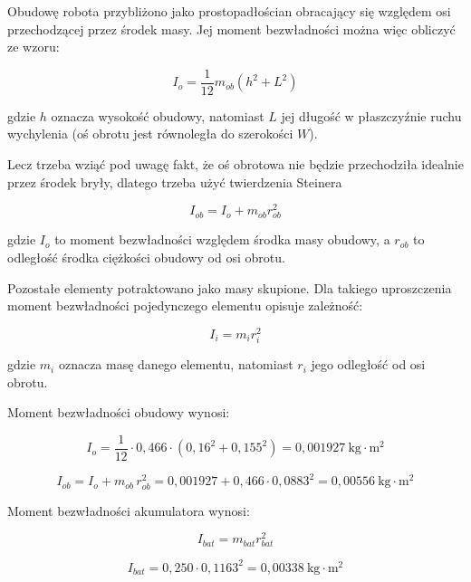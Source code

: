 \documentclass[12pt,twoside]{article}
\begin{document}
Obudowę robota przybliżono jako prostopadłościan obracający się względem osi
przechodzącej przez środek masy. Jej moment bezwładności można więc obliczyć
ze wzoru:

\begin{equation}
I_{o}=\frac{1}{12}m_{ob}(h^2+L^2)
\end{equation}

gdzie $h$ oznacza wysokość obudowy, natomiast $L$ jej długość w płaszczyźnie
ruchu wychylenia (oś obrotu jest równoległa do szerokości $W$).


Lecz trzeba wziąć pod uwagę fakt, że oś obrotowa nie będzie przechodziła idealnie przez środek bryły, dlatego trzeba użyć twierdzenia Steinera

\begin{equation}
I_{ob}=I_{o} + m_{ob}r^2_{ob}
\end{equation}

gdzie $I_{o}$ to moment bezwładności względem środka masy obudowy, a $r_{ob}$ to odległość środka ciężkości obudowy od osi obrotu.

Pozostałe elementy potraktowano jako masy skupione. Dla takiego uproszczenia
moment bezwładności pojedynczego elementu opisuje zależność:

\begin{equation}
I_i=m_i r_i^2
\end{equation}

gdzie $m_i$ oznacza masę danego elementu, natomiast $r_i$ jego odległość od osi
obrotu.

Moment bezwładności obudowy wynosi:

\begin{equation}
I_{o}=\frac{1}{12} \cdot 0{,}466 \cdot (0{,}16^2 + 0{,}155^2) = 0{,}001927\ \mathrm{kg{\cdot}m^2}
\end{equation}

\begin{equation}
I_{ob}=I_{o} + m_{ob}\,r_{ob}^2 = 0{,}001927 + 0{,}466 \cdot 0{,}0883^2 = 0{,}00556\ \mathrm{kg{\cdot}m^2}
\end{equation}

Moment bezwładności akumulatora wynosi:

\begin{equation}
I_{bat}=m_{bat}r_{bat}^2
\end{equation}

\begin{equation}
I_{bat}=0{,}250 \cdot 0{,}1163^2 = 0{,}00338\ \mathrm{kg{\cdot}m^2}
\end{equation}
\end{document}
